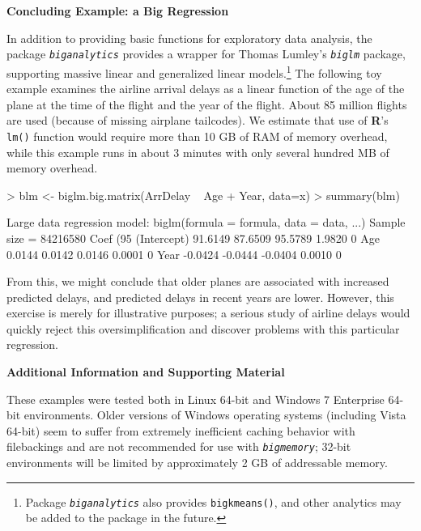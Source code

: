 \documentclass[12pt]{article}
\newcommand{\proglang}[1]{\textbf{#1}}
\newcommand{\pkg}[1]{\texttt{\textsl{#1}}}
\newcommand{\code}[1]{\texttt{#1}}
\begin{document}
\vspace*{0.5cm}
\noindent
{\bf Concluding Example: a Big Regression}
\vspace*{0.5cm}

In addition to providing basic functions for exploratory data analysis, the
package \pkg{biganalytics} provides a wrapper for Thomas Lumley's
\pkg{biglm} package, supporting massive
linear and generalized linear models.\footnote{Package \pkg{biganalytics}
also provides \code{bigkmeans()}, and other analytics may be added to the
package in the future.}  The following toy example examines
the airline arrival delays as a linear function of the age of the plane
at the time of the flight and the year of the flight.  About 85 million
flights are used (because of missing airplane tailcodes). 
We estimate that use of \proglang{R}'s \texttt{lm()}
function would require more than 10 GB of RAM of memory overhead, while
this example runs in about 3 minutes with only several hundred MB of memory
overhead.
\begin{Schunk}
\begin{Sinput}
> blm <- biglm.big.matrix(ArrDelay ~ Age + Year, data=x)
> summary(blm)
\end{Sinput}
\begin{Soutput}
Large data regression model: biglm(formula = formula, data = data, ...)
Sample size = 84216580 
               Coef    (95%     CI)     SE p
(Intercept) 91.6149 87.6509 95.5789 1.9820 0
Age          0.0144  0.0142  0.0146 0.0001 0
Year        -0.0424 -0.0444 -0.0404 0.0010 0
\end{Soutput}
\end{Schunk}
From this, we might conclude that older planes are associated with increased predicted
delays, and predicted delays in recent years are lower.  However, this
exercise is merely for illustrative purposes; a serious study of airline delays would
quickly reject this oversimplification and discover problems with this particular
regression.

\vspace*{0.5cm}
\noindent
{\bf Additional Information and Supporting Material}
\vspace*{0.5cm}

These examples were tested both in Linux 64-bit and Windows 7 Enterprise 64-bit
environments.
Older versions of Windows operating systems (including Vista 64-bit) seem
to suffer from extremely inefficient caching behavior with filebackings and
are not recommended for use with
\pkg{bigmemory}; 32-bit environments will be limited by approximately 2 GB
of addressable memory.
\end{document}
